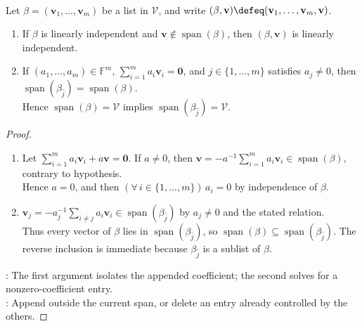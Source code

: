 \begin{proposition} \label{prop:adjoiningandremovingvectors} \\
Let $\beta=(\mathbf{v}_1,\ldots,\mathbf{v}_m)$ be a list in $\mathcal{V}$, and write $(\beta,\mathbf{v})\defeq(\mathbf{v}_1,\ldots,\mathbf{v}_m,\mathbf{v})$.
\begin{enumerate}[label=(\roman*)]
\setlength{\itemsep}{0pt}
\item If $\beta$ is linearly independent and $\mathbf{v}\notin\operatorname{span}(\beta)$, then $(\beta,\mathbf{v})$ is linearly independent.
\item If $(a_1,\ldots,a_m)\in\mathbb{F}^m$, $\sum\limits_{i=1}^{m}a_i\mathbf{v}_i=\mathbf{0}$, and $j\in\{1,\ldots,m\}$ satisfies $a_j\neq0$, then $\operatorname{span}(\beta_{\widehat{j}})=\operatorname{span}(\beta)$.\\
Hence $\operatorname{span}(\beta)=\mathcal{V}$ implies $\operatorname{span}(\beta_{\widehat{j}})=\mathcal{V}$.
\end{enumerate}
\begin{proof}
\begin{enumerate}[label=(\roman*)]
\setlength{\itemsep}{0pt}
\item Let $\sum\limits_{i=1}^{m}a_i\mathbf{v}_i+a\mathbf{v}=\mathbf{0}$. If $a\neq0$, then $\mathbf{v}=-a^{-1}\sum\limits_{i=1}^{m}a_i\mathbf{v}_i\in\operatorname{span}(\beta)$, contrary to hypothesis.\\
Hence $a=0$, and then $(\forall\,i\in\{1,\ldots,m\})\,a_i=0$ by independence of $\beta$.
\item $\mathbf{v}_j=-a_j^{-1}\sum\limits_{i\neq j}a_i\mathbf{v}_i\in\operatorname{span}(\beta_{\widehat{j}})$ by $a_j\neq0$ and the stated relation.\\
Thus every vector of $\beta$ lies in $\operatorname{span}(\beta_{\widehat{j}})$, so $\operatorname{span}(\beta)\subseteq\operatorname{span}(\beta_{\widehat{j}})$. The reverse inclusion is immediate because $\beta_{\widehat{j}}$ is a sublist of $\beta$.
\end{enumerate}
: The first argument isolates the appended coefficient; the second solves for a nonzero-coefficient entry.\\
: Append outside the current span, or delete an entry already controlled by the others.
\end{proof}
\end{proposition}

